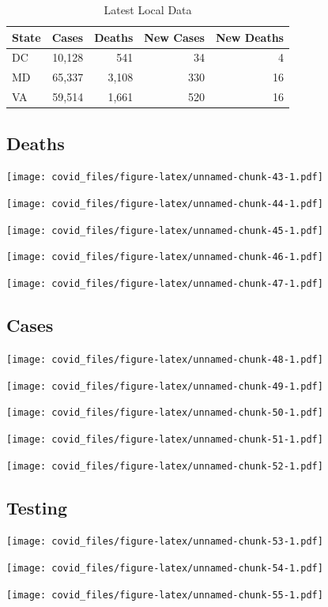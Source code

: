 \documentclass[]{article}
\begin{document}
\begin{table}[!h]

\caption{\label{tab:unnamed-chunk-42}Latest Local Data}
\centering
\begin{tabular}{l|r|r|r|r}
\hline
State & Cases & Deaths & New Cases & New Deaths\\
\hline
DC & 10,128 & 541 & 34 & 4\\
\hline
MD & 65,337 & 3,108 & 330 & 16\\
\hline
VA & 59,514 & 1,661 & 520 & 16\\
\hline
\end{tabular}
\end{table}

\newpage

\hypertarget{deaths-2}{%
\subsection{Deaths}\label{deaths-2}}

\texttt{[image: covid\_files/figure-latex/unnamed-chunk-43-1.pdf]}

\texttt{[image: covid\_files/figure-latex/unnamed-chunk-44-1.pdf]}

\texttt{[image: covid\_files/figure-latex/unnamed-chunk-45-1.pdf]}

\texttt{[image: covid\_files/figure-latex/unnamed-chunk-46-1.pdf]}

\texttt{[image: covid\_files/figure-latex/unnamed-chunk-47-1.pdf]}

\newpage

\hypertarget{cases-2}{%
\subsection{Cases}\label{cases-2}}

\texttt{[image: covid\_files/figure-latex/unnamed-chunk-48-1.pdf]}

\texttt{[image: covid\_files/figure-latex/unnamed-chunk-49-1.pdf]}

\texttt{[image: covid\_files/figure-latex/unnamed-chunk-50-1.pdf]}

\texttt{[image: covid\_files/figure-latex/unnamed-chunk-51-1.pdf]}

\texttt{[image: covid\_files/figure-latex/unnamed-chunk-52-1.pdf]}

\newpage

\hypertarget{testing-2}{%
\subsection{Testing}\label{testing-2}}

\texttt{[image: covid\_files/figure-latex/unnamed-chunk-53-1.pdf]}

\texttt{[image: covid\_files/figure-latex/unnamed-chunk-54-1.pdf]}

\texttt{[image: covid\_files/figure-latex/unnamed-chunk-55-1.pdf]}
\end{document}
